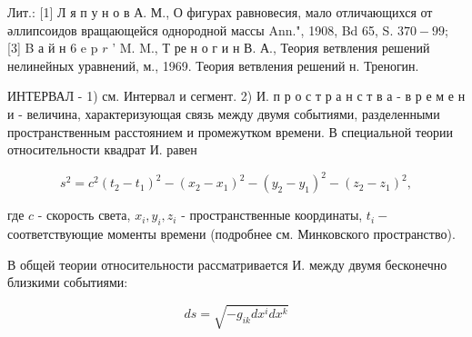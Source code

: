 \documentclass[10pt]{article}
\begin{document}
Лит.: [1] Л я п у н о в А. М., О фигурах равновесия, мало отличающихся от әллипсоидов вращающейся однородной массы Ann.", 1908, Bd 65, S. $370-99$; [3] B а й н 6 e p $r$ ' M. M., Т ре н о г и н В. А., Теория ветвления решений нелинейных уравнений, м., 1969. Теория ветвления решений н. Треногин.



ИНТЕРВАЛ - 1) см. Интервал и сегмент. 2) И. п р о с т р а н с т в а - в р е м е н и - величина, характеризующая связь между двумя событиями, разделенными пространственным расстоянием и промежутком времени. В специальной теории относительности квадрат И. равен



\[

s^{2}=c^{2}\left(t_{2}-t_{1}\right)^{2}-\left(x_{2}-x_{1}\right)^{2}-\left(y_{2}-y_{1}\right)^{2}-\left(z_{2}-z_{1}\right)^{2},

\]



где $c$ - скорость света, $x_{i}, y_{i}, z_{i}$ - пространственные координаты, $t_{i}-$ соответствующие моменты времени (подробнее см. Минковского пространство).



В общей теории относительности рассматривается И. между двумя бесконечно близкими событиями:



\[

d s=\sqrt{-g_{i k} d x^{i} d x^{k}}

\]
\end{document}
